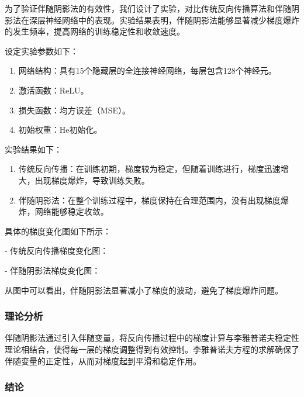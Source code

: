 \documentclass[12pt,a4paper]{amsart}
\begin{document}
为了验证伴随阴影法的有效性，我们设计了实验，对比传统反向传播算法和伴随阴影法在深层神经网络中的表现。实验结果表明，伴随阴影法能够显著减少梯度爆炸的发生频率，提高网络的训练稳定性和收敛速度。

设定实验参数如下：

\begin{enumerate}

  \item 网络结构：具有15个隐藏层的全连接神经网络，每层包含128个神经元。

  \item 激活函数：ReLU。

  \item 损失函数：均方误差（MSE）。

  \item 初始权重：He初始化。

\end{enumerate}

实验结果如下：

\begin{enumerate}

  \item 传统反向传播：在训练初期，梯度较为稳定，但随着训练进行，梯度迅速增大，出现梯度爆炸，导致训练失败。
   
  \item 伴随阴影法：在整个训练过程中，梯度保持在合理范围内，没有出现梯度爆炸，网络能够稳定收敛。

\end{enumerate}

具体的梯度变化图如下所示：

- 传统反向传播梯度变化图：


- 伴随阴影法梯度变化图：


从图中可以看出，伴随阴影法显著减小了梯度的波动，避免了梯度爆炸问题。

\subsubsection{理论分析}

伴随阴影法通过引入伴随变量，将反向传播过程中的梯度计算与李雅普诺夫稳定性理论相结合，使得每一层的梯度调整得到有效控制。李雅普诺夫方程的求解确保了伴随变量的正定性，从而对梯度起到平滑和稳定作用。

\subsubsection{结论}
\end{document}
